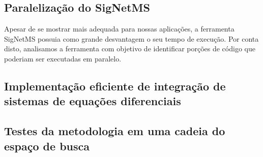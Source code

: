 \documentclass[12pt]{article}
\begin{document}
\subsection{Paralelização do SigNetMS}
Apesar de se mostrar mais adequada para nossas aplicações, a ferramenta
SigNetMS possuia como grande desvantagem o seu tempo de execução. Por
conta disto, analisamos a ferramenta com objetivo de identificar porções 
de código que poderiam ser executadas em paralelo.

\subsection{Implementação eficiente de integração de sistemas de
equações diferenciais}

\subsection{Testes da metodologia em uma cadeia do espaço de busca}



 

\end{document}
